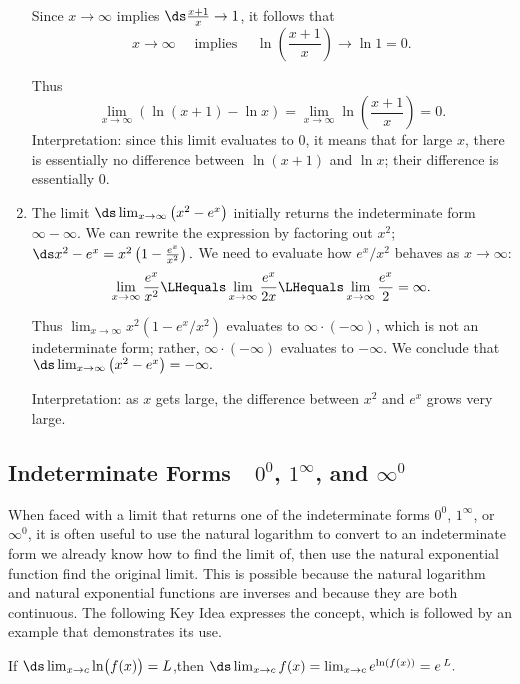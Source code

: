\begin{example}
\begin{enumerate}
Since $x\to\infty$ implies $\ds\frac{x+1}x\to 1$, it follows that 
\[x\to\infty \quad \text{ implies }\quad \ln\left(\frac{x+1}x\right)\to\ln 1=0.\]

Thus
\[
 \lim_{x\to\infty} \left(\ln(x+1)-\ln x\right)
 = \lim_{x\to \infty} \ln \left(\frac{x+1}x\right)=0.
\]
Interpretation: since this limit evaluates to 0, it means that for large $x$, there is essentially no difference between $\ln (x+1)$ and $\ln x$; their difference is essentially 0.

	\item	The limit $\ds \lim_{x\to\infty} \left(x^2-e^x\right)$ initially returns the indeterminate form $\infty-\infty$. We can rewrite the expression by factoring out $x^2$; $\ds x^2-e^x = x^2\left(1-\frac{e^x}{x^2}\right).$ We need to evaluate how $e^x/x^2$ behaves as $x\to\infty$:
\[
\lim_{x\to\infty}\frac{e^x}{x^2} \LHequals \lim_{x\to\infty} \frac{e^x}{2x}
\LHequals \lim_{x\to\infty} \frac{e^x}{2} = \infty.
\]

Thus $\lim_{x\to\infty}x^2(1-e^x/x^2)$ evaluates to $\infty\cdot(-\infty)$, which is not an indeterminate form; rather, $\infty\cdot(-\infty)$ evaluates to $-\infty$. We conclude that 
$\ds \lim_{x\to\infty} \left(x^2-e^x\right) = -\infty.$

Interpretation: as $x$ gets large, the difference between $x^2$ and $e^x$ grows very large.
\end{enumerate}
\end{example}

\subsection{Indeterminate Forms\ \ \texorpdfstring{$0^0$, $1^\infty$, and $\infty^0$}{0\^{}0, 1\^{}∞, and ∞\^{}0}}

When faced with a limit that returns one of the indeterminate forms $0^0$, $1^\infty$, or $\infty^0$, it is often useful to use the natural logarithm to convert to an indeterminate form we already know how to find the limit of, then use the natural exponential function find the original limit. This is possible because the natural logarithm and natural exponential functions are inverses and because they are both continuous. The following Key Idea expresses the concept, which is followed by an example that demonstrates its use.

\begin{keyidea}\label{idea:LHR_power}
If $\ds \lim_{x\to c} \ln\bigl(f(x)\bigr) = L$,\quad then 
$\ds \lim_{x\to c} f(x) = \lim_{x\to c} e^{\ln(f(x))} = e\,^L.$ 
\end{keyidea}

